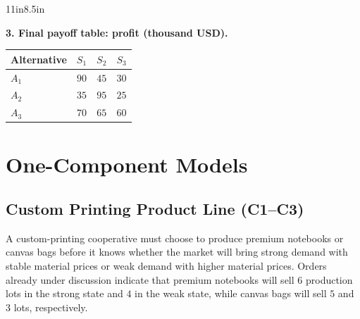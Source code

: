 \begin{CalculationLandscape}{11in}{8.5in}
\noindent\begin{minipage}{\linewidth}
\textbf{3. Final payoff table: profit (thousand USD).}
\begin{center}
\begin{tabular}{@{}lccc@{}}
\toprule
Alternative & \(S_1\) & \(S_2\) & \(S_3\) \\
\midrule
\(A_1\) & \(90\) & \(45\) & \(30\) \\
\(A_2\) & \(35\) & \(95\) & \(25\) \\
\(A_3\) & \(70\) & \(65\) & \(60\) \\
\bottomrule
\end{tabular}
\end{center}
\end{minipage}



\end{CalculationLandscape}


	\section{One-Component Models}
	\label{sec:one-component-models}


	\subsection{Custom Printing Product Line (C1--C3)}
	\label{sec:problem5-custom-printing-product-line-c1-c3}

	A custom-printing cooperative must choose to produce premium notebooks or canvas bags before it knows whether the market will bring strong demand with stable material prices or weak demand with higher material prices. Orders already under discussion indicate that premium notebooks will sell \(6\) production lots in the strong state and \(4\) in the weak state, while canvas bags will sell \(5\) and \(3\) lots, respectively.


